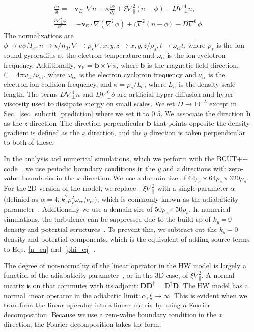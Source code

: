 \documentclass[twocolumn,showkeys,superscriptaddress]{revtex4}
\def\beqar{\begin{eqnarray}}
\def\eeqar{\end{eqnarray}}
\newcommand{\pdiff}[2]{\frac{\partial#1}{\partial#2}}
\def\grad{\nabla}
\newcommand{\gradpar}{\grad_\parallel}
\newcommand{\gradperp}{\grad_\perp}
\begin{document}
\beqar
\label{n_eq}
\pdiff{n}{t} = - {\mathbf v_E} \cdot \grad n - \kappa \pdiff{\phi}{y} + \xi \gradpar^2 (n - \phi) - D \gradperp^4 n, \\
\label{phi_eq}
\pdiff{\gradperp^2 \phi}{t} = - {\mathbf v_E} \cdot \grad (\gradperp^2 \phi) + \xi \gradpar^2 (n - \phi) - D \gradperp^6 \phi
\eeqar
The normalizations are $\phi \to e \phi/T_e, n \to n/n_0, \grad \to \rho_s \grad , x,y,z \to x,y,z/\rho_s, t \to \omega_{ci} t $, where $\rho_s$ is the ion sound gyroradius at the electron temperature and $\omega_{ci}$ is
the ion cyclotron frequency. Additionally, $\mathbf{v_E} = \mathbf{b} \times \grad \phi$, where $\mathbf{b}$ is the magnetic field direction, $\xi = 4 \pi \omega_{ce}/\nu_{ei}$, where $\omega_{ce}$ is the electron cyclotron
frequency and $\nu_{ei}$ is the electron-ion collision frequency,
and $\kappa = \rho_s/L_n$, where $L_n$ is the density scale length. The terms $D \gradperp^4 n$ and $D \gradperp^6 \phi$ are artificial hyper-diffusion and hyper-viscosity used to dissipate
energy on small scales. We set $D \to 10^{-5}$ except in Sec.~\ref{sec_subcrit_prediction} where we set it to $0.5$.
We associate the direction $\mathbf{b}$ as the $z$ direction. The direction perpendicular $\mathbf{b}$ that
points opposite the density gradient is defined as the $x$ direction, and the $y$ direction is taken perpendicular to both of these.

In the analysis and numerical simulations, which we perform with the BOUT++ code~\cite{dudson2009}, we use periodic boundary conditions in
the $y$ and $z$ directions with zero-value boundaries in the $x$ direction. We use a domain size of $64 \rho_s \times 64 \rho_s \times 320 \rho_s$.
For the 2D version of the model, we replace $-\xi \gradpar^2$ with a single parameter $\alpha$ (definied as $\alpha = 4 \pi k_z^2 \rho_s^2 \omega_{ce} /\nu_{ei})$, 
which is commonly known as the adiabaticity parameter~\cite{camargo1995,camargo1998}. Additionally we use a domain size of $50 \rho_s \times 50 \rho_s$.
In numerical simulations, the turbulence can be suppressed due to the build-up of $k_y=0$ density and potential structures~\cite{biskamp1995}. To prevent this, we subtract out the $k_y=0$
density and potential components, which is the equivalent of adding source terms to Eqs.~\ref{n_eq} and~\ref{phi_eq}~\cite{friedman2012b}.

The degree of non-normality of the linear operator in the HW model is largely a function of the adiabaticity parameter~\cite{camargo1998}, or in the 3D case, of $\xi \gradpar^2$. 
A normal matrix is on that commutes with its adjoint: $\mathbf{D} \mathbf{D}^\dagger = \mathbf{D}^\dagger \mathbf{D}$.
The HW model has a normal linear operator in the adiabatic limit: $\alpha, \xi \to \infty$. 
This is evident when we transform the linear operator into a linear matrix by using a Fourier decomposition. Because we use a zero-value boundary condition in the $x$ direction, the
Fourier decomposition takes the form:
\end{document}
